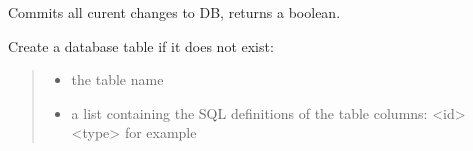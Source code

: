 \documentclass[letterpaper,12pt,english]{sphinxmanual}
\begin{document}
\begin{fulllineitems}
\begin{fulllineitems}
\end{fulllineitems}


\begin{fulllineitems}
\label{\detokenize{api/networking:cbmpy.CBNetDB.DBTools.commitDB}}
\pysigstartsignatures
\pysiglinewithargsret
{}
{}
{}
\pysigstopsignatures
\sphinxAtStartPar
Commits all curent changes to DB, returns a boolean.

\end{fulllineitems}


\begin{fulllineitems}
\label{\detokenize{api/networking:cbmpy.CBNetDB.DBTools.createDBTable}}
\pysigstartsignatures
\pysiglinewithargsret
{}
{\sphinxparamcomma {}}
{}
\pysigstopsignatures
\sphinxAtStartPar
Create a database table if it does not exist:
\begin{quote}\begin{description}
\begin{itemize}
\item {} 
\sphinxAtStartPar
{} \textendash{} the table name

\item {} 
\sphinxAtStartPar
{} \textendash{} a list containing the SQL definitions of the table columns: \textless{}id\textgreater{} \textless{}type\textgreater{} for example 

\end{itemize}

\end{description}\end{quote}

\end{fulllineitems}



\end{fulllineitems}
\end{document}
